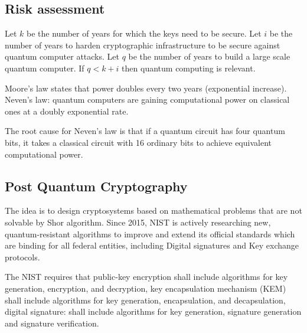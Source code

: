 \subsection{Risk assessment}

Let $k$ be the number of years for which the keys need to be secure. Let $i$ be the number of years to harden cryptographic infrastructure to be secure against quantum computer attacks. Let $q$ be the number of years to build a large scale quantum computer. If $q<k+i$ then quantum computing is relevant.

Moore's law states that power doubles every two years (exponential increase). Neven's law: quantum computers are gaining computational power on classical ones at a doubly exponential rate.

The root cause for Neven's law is that if a quantum circuit has four quantum bits, it takes a classical circuit with 16 ordinary bits to achieve equivalent computational power. 

\subsection{Post Quantum Cryptography}
The idea is to design cryptosystems based on mathematical problems that are not solvable by Shor algorithm. Since 2015, NIST is actively researching new, quantum-resistant algorithms to improve and extend its official standards which are binding for all federal entities, including Digital signatures and Key exchange protocols.

The NIST requires that public-key encryption shall include algorithms for key generation, encryption, and decryption, key encapsulation mechanism (KEM) shall include algorithms for key generation, encapsulation, and decapsulation, digital signature: shall include algorithms for key generation, signature generation and signature verification.



